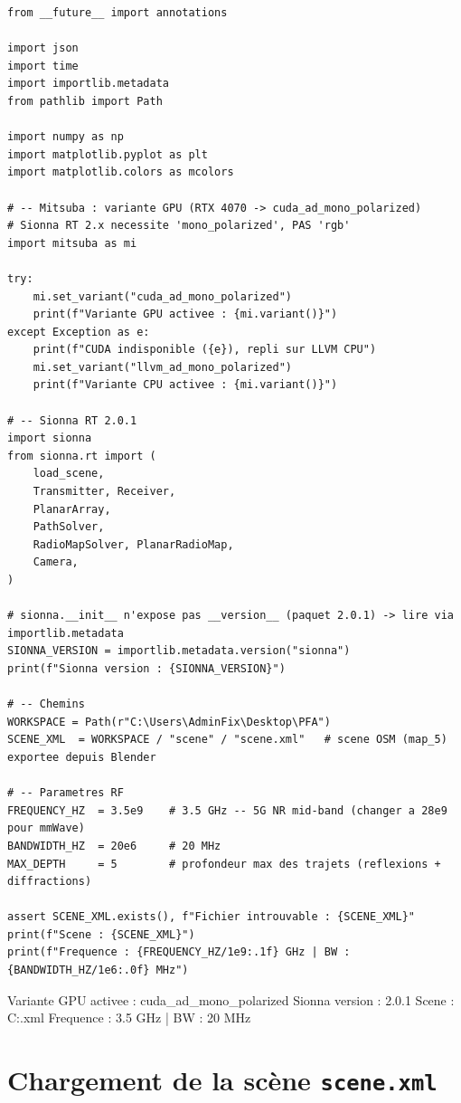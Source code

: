 \documentclass[11pt,a4paper]{article}
\begin{document}
\begin{lstlisting}
from __future__ import annotations

import json
import time
import importlib.metadata
from pathlib import Path

import numpy as np
import matplotlib.pyplot as plt
import matplotlib.colors as mcolors

# -- Mitsuba : variante GPU (RTX 4070 -> cuda_ad_mono_polarized)
# Sionna RT 2.x necessite 'mono_polarized', PAS 'rgb'
import mitsuba as mi

try:
    mi.set_variant("cuda_ad_mono_polarized")
    print(f"Variante GPU activee : {mi.variant()}")
except Exception as e:
    print(f"CUDA indisponible ({e}), repli sur LLVM CPU")
    mi.set_variant("llvm_ad_mono_polarized")
    print(f"Variante CPU activee : {mi.variant()}")

# -- Sionna RT 2.0.1
import sionna
from sionna.rt import (
    load_scene,
    Transmitter, Receiver,
    PlanarArray,
    PathSolver,
    RadioMapSolver, PlanarRadioMap,
    Camera,
)

# sionna.__init__ n'expose pas __version__ (paquet 2.0.1) -> lire via importlib.metadata
SIONNA_VERSION = importlib.metadata.version("sionna")
print(f"Sionna version : {SIONNA_VERSION}")

# -- Chemins
WORKSPACE = Path(r"C:\Users\AdminFix\Desktop\PFA")
SCENE_XML  = WORKSPACE / "scene" / "scene.xml"   # scene OSM (map_5) exportee depuis Blender

# -- Parametres RF
FREQUENCY_HZ  = 3.5e9    # 3.5 GHz -- 5G NR mid-band (changer a 28e9 pour mmWave)
BANDWIDTH_HZ  = 20e6     # 20 MHz
MAX_DEPTH     = 5        # profondeur max des trajets (reflexions + diffractions)

assert SCENE_XML.exists(), f"Fichier introuvable : {SCENE_XML}"
print(f"Scene : {SCENE_XML}")
print(f"Frequence : {FREQUENCY_HZ/1e9:.1f} GHz | BW : {BANDWIDTH_HZ/1e6:.0f} MHz")
\end{lstlisting}

\begin{consoleout}
Variante GPU activee : cuda_ad_mono_polarized
Sionna version : 2.0.1
Scene : C:\Users\AdminFix\Desktop\PFA\scene\scene.xml
Frequence : 3.5 GHz | BW : 20 MHz
\end{consoleout}

\section{Chargement de la scène \texttt{scene.xml}}
\end{document}
